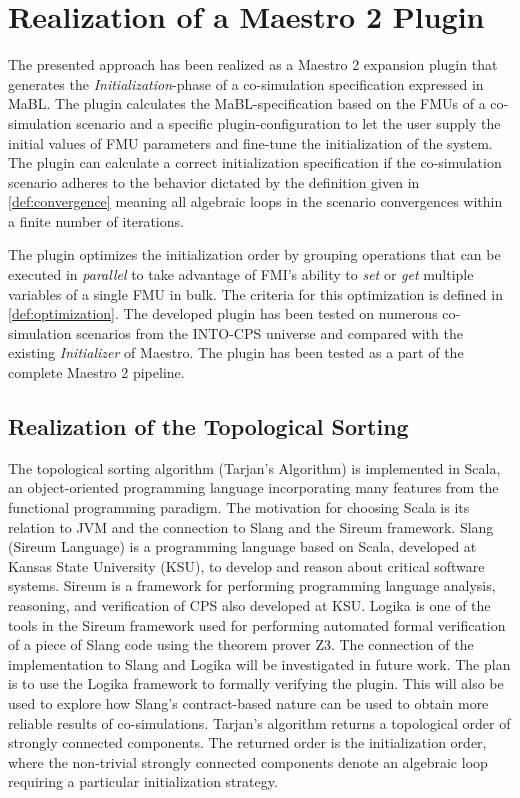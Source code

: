 \section{Realization of a Maestro 2 Plugin}\label{sc:implementation}
The presented approach has been realized as a Maestro 2 expansion plugin that generates the \textit{Initialization}-phase of a co-simulation specification expressed in MaBL. The plugin calculates the MaBL-specification based on the FMUs of a co-simulation scenario and a specific plugin-configuration to let the user supply the initial values of FMU parameters and fine-tune the initialization of the system. The plugin can calculate a correct initialization specification if the co-simulation scenario adheres to the behavior dictated by the definition given in \cref{def:convergence} meaning all algebraic loops in the scenario convergences within a finite number of iterations.

The plugin optimizes the initialization order by grouping operations that can be executed in \textit{parallel} to take advantage of FMI's ability to \textit{set} or \textit{get} multiple variables of a single FMU in bulk. The criteria for this optimization is defined in \cref{def:optimization}. 
The developed plugin has been tested on numerous co-simulation scenarios from the INTO-CPS universe\cite{Maestro} and compared with the existing \textit{Initializer} of Maestro. The plugin has been tested as a part of the complete Maestro 2 pipeline. 

\subsection{Realization of the Topological Sorting}
The topological sorting algorithm (Tarjan's Algorithm) is implemented in Scala\cite{Scala}, an object-oriented programming language incorporating many features from the functional programming paradigm. The motivation for choosing Scala\cite{Scala} is its relation to JVM and the connection to Slang and the Sireum framework\cite{inbook}. Slang (Sireum Language) is a programming language based on Scala, developed at Kansas State University (KSU), to develop and reason about critical software systems. Sireum is a framework for performing programming language analysis, reasoning, and verification of CPS also developed at KSU. Logika is one of the tools in the Sireum framework used for performing automated formal verification of a piece of Slang code using the theorem prover Z3\cite{Z3prover2020Sep}.
The connection of the implementation to Slang and Logika will be investigated in future work. The plan is to use the Logika framework to formally verifying the plugin. This will also be used to explore how Slang's contract-based nature can be used to obtain more reliable results of co-simulations. Tarjan's algorithm returns a topological order of strongly connected components. The returned order is the initialization order, where the non-trivial strongly connected components denote an algebraic loop requiring a particular initialization strategy. 

